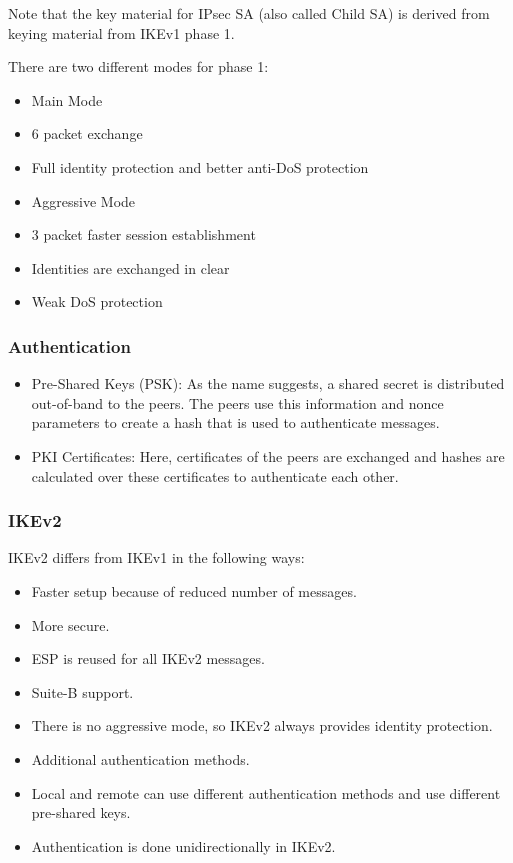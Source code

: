 Note that the key material for IPsec SA (also called Child SA) is derived from keying material from IKEv1 phase 1.

There are two different modes for phase 1:
\begin{itemize}
    \item Main Mode
    \item 6 packet exchange
    \item Full identity protection and better anti-DoS protection
    \item Aggressive Mode
    \item 3 packet faster session establishment
    \item Identities are exchanged in clear
    \item Weak DoS protection
\end{itemize}

\subsubsection{Authentication} 
\begin{itemize}
    \item Pre-Shared Keys (PSK): As the name suggests, a shared secret is distributed out-of-band to the peers. The peers use this information and nonce parameters to create a hash that is used to authenticate messages.
    \item PKI Certificates: Here, certificates of the peers are exchanged and hashes are calculated over these certificates to authenticate each other.
\end{itemize}

\subsubsection{IKEv2}
IKEv2 differs from IKEv1 in the following ways:
\begin{itemize}
    \item Faster setup because of reduced number of messages.
    \item More secure.
    \item ESP is reused for all IKEv2 messages.
    \item Suite-B support.
    \item There is no aggressive mode, so IKEv2 always provides identity protection.
    \item Additional authentication methods.
    \item Local and remote can use different authentication methods and use different pre-shared keys.
    \item Authentication is done unidirectionally in IKEv2. 
\end{itemize}
      
